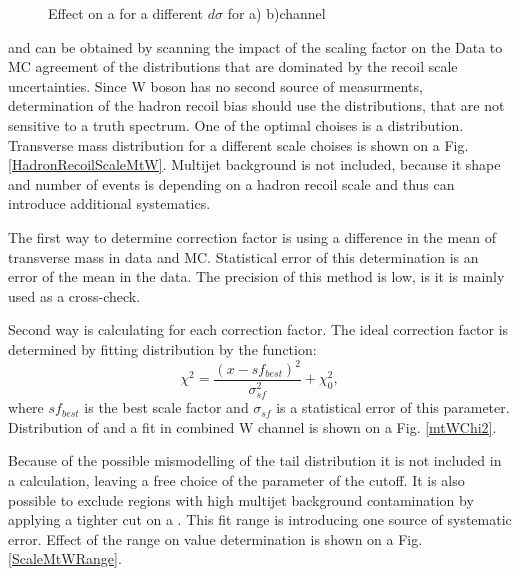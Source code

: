 \begin{figure}[!tbp]
\begin{minipage}[h]{0.49\linewidth}
\end{minipage}
\hfill
\begin{minipage}[h]{0.49\linewidth}
\end{minipage}
\caption{Effect on a \cw for a different $d\sigma$ for a) \wenu b)\wmunu channel}
\label{uPAr}
\end{figure}
and can be obtained by scanning the impact of the scaling factor on the Data to MC agreement of the distributions that are dominated by the recoil scale uncertainties. Since W boson has no second source of \ptw measurments, determination of the hadron recoil bias should use the distributions, that  are not sensitive to a truth \ptw spectrum.  One of the optimal choises is a \mtw distribution. Transverse mass distribution for a different scale choises is shown on a Fig. \ref{HadronRecoilScaleMtW}. Multijet background is not included, because it shape and number of events is depending on a hadron recoil scale and thus can introduce additional systematics.

The first way to determine correction factor is using a difference in the mean of transverse mass in data and MC. Statistical error of this determination is an error of the mean in the data. The precision of this method is low, is it is mainly used as a cross-check. 

Second way is calculating \chiD for each correction factor. The ideal correction factor is determined by fitting \chiD distribution by the function:
\begin{equation}
\chi^2 = \frac{(x-sf_{best})^2}{\sigma_{sf}^2}+\chi^2_0,
\end{equation}
where $sf_{best}$ is the best scale factor and $\sigma_{sf}$ is a statistical error of this parameter. Distribution of \chiD and a fit in combined W channel is shown on a Fig. \ref{mtWChi2}.

Because of the possible mismodelling of the tail \mtw distribution it is not included in a \chiD calculation, leaving a free choice of the parameter of the cutoff.  It is also possible to exclude regions with high multijet background contamination by applying a tighter cut on a \mtw. 
This fit range is introducing one source of systematic error. Effect of the range on value determination is shown on a Fig. \ref{ScaleMtWRange}.
 

